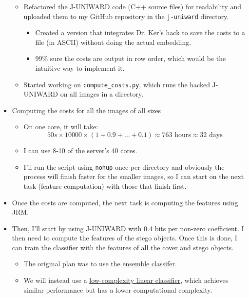 \documentclass[11pt,a4paper]{report}
\begin{document}
\begin{itemize}
\begin{itemize}
  \item Refactored the J-UNIWARD code (C++ source files) for readability and uploaded them to my GitHub repository in the \texttt{j-uniward} directory.
    \begin{itemize}
    \item Created a version that integrates Dr. Ker's hack to save the costs to a file (in ASCII) without doing the actual embedding.
    \item 99\% sure the costs are output in row order, which would be the intuitive way to implement it.
  \end{itemize}

  \item Started working on \texttt{compute\_costs.py}, which runs the hacked J-UNIWARD on all images in a directory.
  \end{itemize}

\item Computing the costs for all the images of all sizes
  \begin{itemize}
  \item On one core, it will take:
    \begin{equation*}
    50s \times 10000 \times (1 + 0.9 + ... + 0.1) \approx 763 \text{ hours} \approx 32 \text{ days}
    \end{equation*}
  \item I can use 8-10 of the server's 40 cores.
  \item I'll run the script using \texttt{nohup} once per directory and obviously the process will finish faster for the smaller images, so I can start on the next task (feature computation) with those that finish first.
  \end{itemize}

\item Once the costs are computed, the next task is computing the features using JRM.

\item Then, I'll start by using J-UNIWARD with 0.4 bits per non-zero coefficient. I then need to compute the features of the stego objects. Once this is done, I can train the classifier with the features of all the cover and stego objects.
  \begin{itemize}
  \item The original plan was to use the \href{http://dde.binghamton.edu/download/ensemble/}{ensemble classifer}.
  \item We will instead use a \href{http://dde.binghamton.edu/download/LCLSMR/}{low-complexity linear classifier}, which achieves similar performance but has a lower computational complexity.
  \end{itemize}


\end{itemize}
\end{document}
